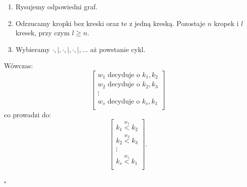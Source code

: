 \documentclass[12pt,a4paper]{article}
\theoremstyle{break}
\begin{document}
		\begin{enumerate}[1.]
			\item Rysujemy odpowiedni graf.
			\item Odrzucamy kropki bez kreski oraz te z jedną kreską. Pozostaje $n$ kropek i $l$ kresek, przy czym $l \geq n$.
			\item Wybieramy $\cdot, |, \cdot, |, \cdot, |, \dots$ aż powstanie cykl.
		\end{enumerate}
		
		Wówczas:
		\[
		\begin{bmatrix}
			w_1 \text{ decyduje o } k_1, k_2 \\
			w_2 \text{ decyduje o } k_2, k_3 \\
			\vdots \\
			w_s \text{ decyduje o } k_s, k_1 \\
		\end{bmatrix}
		\]
		co prowadzi do:
		\[
		\begin{bmatrix}
			k_1 \overset{w_1}{<} k_2 \\
			k_2 \overset{w_2}{<} k_3 \\
			\vdots \\
			k_s \overset{w_s}{<} k_1 \\
		\end{bmatrix}.
		\]
	
	\begin{flushright}
		$\square$
	\end{flushright}
	
	\newpage
	
\end{document}
